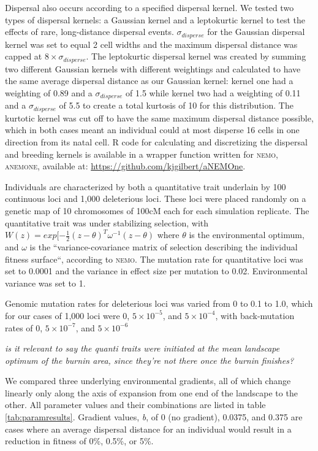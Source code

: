 Dispersal also occurs according to a specified dispersal kernel. We tested two types of dispersal 
kernels: a Gaussian kernel and a leptokurtic kernel to test the effects of rare, long-distance dispersal 
events. $\sigma_{disperse}$ for the Gaussian dispersal kernel was set to equal 2 cell widths and the maximum dispersal 
distance was capped at $8 \times \sigma_{disperse}$. The leptokurtic dispersal kernel was created by summing 
two different Gaussian kernels with different weightings and calculated to have the same average 
dispersal distance as our Gaussian kernel: kernel one had a weighting of 0.89 and a $\sigma_{disperse}$ of 1.5 
while kernel two had a weighting of 0.11 and a $\sigma_{disperse}$ of 5.5 to create a total kurtosis of 10 for this 
distribution. The kurtotic kernel was cut off to have the same maximum dispersal distance possible, which in 
both cases meant an individual could at most disperse 16 cells in one direction from its natal cell. 
R code for calculating and discretizing the dispersal and breeding kernels is available in a 
wrapper function written for \textsc{nemo}, \textsc{anemone}, available at: \url{https://github.com/kjgilbert/aNEMOne}.

Individuals are characterized by both a quantitative trait underlain by 100 continuous loci and 1,000 deleterious loci. 
These loci were placed randomly on a genetic map of 10 chromosomes of 100cM each for each simulation replicate. 
The quantitative trait was under stabilizing selection, with $W(z) = exp[-\frac{1}{2}(z - \theta)^T\omega^{-1}(z-\theta)$ 
where $\theta$ is the environmental optimum, and $\omega$ is the ``variance-covariance matrix of selection describing the 
individual fitness surface``, according to \textsc{nemo}. The mutation rate for quantitative loci was 
set to 0.0001 and the variance in effect size per mutation to 0.02. Environmental variance was set to 1. 

Genomic mutation rates for deleterious loci was varied from 0 to 0.1 to 1.0, which for our cases of 1,000 loci 
were 0, $5\times10^{-5}$, and $5\times10^{-4}$, with back-mutation rates of 0, $5\times10^{-7}$, and $5\times10^{-6}$

\emph{is it relevant to say the quanti traits were initiated at the mean landscape optimum of the burnin area, since they're not there once the burnin finishes?}

We compared three underlying environmental gradients, all of which change linearly only along the axis of 
expansion from one end of the landscape to the other. All parameter values and their combinations are 
listed in table \ref{tab:paramresults}. Gradient values, \emph{b}, of 0 (no gradient), 0.0375, 
and 0.375 are cases where an average dispersal distance for an individual would result in a reduction 
in fitness of 0\%, 0.5\%, or 5\%.




